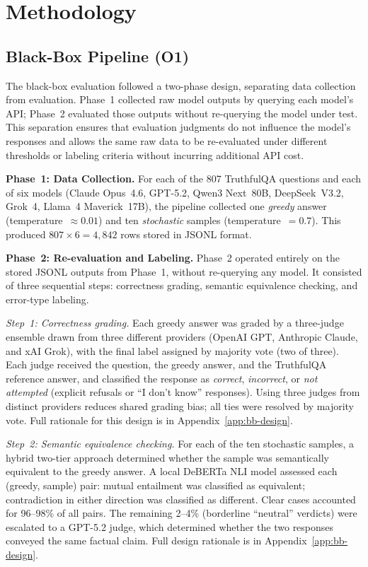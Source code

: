 \documentclass[12pt,twocolumn]{article}
\begin{document}
\section{Methodology}
\label{sec:method}

\subsection{Black-Box Pipeline (O1)}
\label{sec:method-bb}

The black-box evaluation followed a two-phase design, separating
data collection from evaluation. Phase~1 collected raw model outputs
by querying each model's API; Phase~2 evaluated those outputs without
re-querying the model under test. This separation ensures that
evaluation judgments do not influence the model's responses and allows
the same raw data to be re-evaluated under different thresholds or
labeling criteria without incurring additional API cost.

\textbf{Phase~1: Data Collection.}
For each of the 807 TruthfulQA questions and each of six models
(Claude Opus~4.6, GPT-5.2, Qwen3 Next~80B, DeepSeek~V3.2, Grok~4,
Llama~4 Maverick~17B), the pipeline collected one \emph{greedy}
answer (temperature~$\approx 0.01$) and ten \emph{stochastic}
samples (temperature~$= 0.7$). This produced $807 \times 6 = 4{,}842$
rows stored in JSONL format.

\textbf{Phase~2: Re-evaluation and Labeling.}
Phase~2 operated entirely on the stored JSONL outputs from Phase~1,
without re-querying any model. It consisted of three sequential
steps: correctness grading, semantic equivalence checking, and
error-type labeling.

\textit{Step~1: Correctness grading.}
Each greedy answer was graded by a three-judge ensemble drawn from
three different providers (OpenAI GPT, Anthropic Claude, and xAI
Grok), with the final label assigned by majority vote (two of three).
Each judge received the question, the greedy answer, and the
TruthfulQA reference answer, and classified the response as
\emph{correct}, \emph{incorrect}, or \emph{not attempted}
(explicit refusals or ``I don't know'' responses). Using three
judges from distinct providers reduces shared grading bias; all
ties were resolved by majority vote. Full rationale for this design
is in Appendix~\ref{app:bb-design}.

\textit{Step~2: Semantic equivalence checking.}
For each of the ten stochastic samples, a hybrid two-tier approach
determined whether the sample was semantically equivalent to the
greedy answer. A local DeBERTa NLI model \citep{he2021deberta}
assessed each (greedy, sample) pair: mutual entailment was
classified as equivalent; contradiction in either direction was
classified as different. Clear cases accounted for 96--98\% of all
pairs. The remaining 2--4\% (borderline ``neutral'' verdicts) were
escalated to a GPT-5.2 judge, which determined whether the two
responses conveyed the same factual claim. Full design rationale is
in Appendix~\ref{app:bb-design}.
\end{document}
